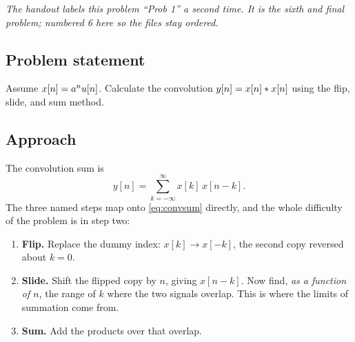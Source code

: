 





\vspace{-6pt}
\begin{center}
{\footnotesize\itshape The handout labels this problem ``Prob 1'' a second time.
It is the sixth and final problem; numbered 6 here so the files stay ordered.}
\end{center}
\vspace{4pt}

\subsection*{Problem statement}

Assume $x[n] = a^n u[n]$. Calculate the convolution
$y[n] = x[n] \ast x[n]$ using the flip, slide, and sum method.

\subsection*{Approach}

The convolution sum is
\begin{equation}
  y[n] = \sum_{k=-\infty}^{\infty} x[k]\,x[n-k].
  \label{eq:convsum}
\end{equation}
The three named steps map onto \eqref{eq:convsum} directly, and the whole
difficulty of the problem is in step two:

\begin{enumerate}
  \item \textbf{Flip.} Replace the dummy index: $x[k] \to x[-k]$, the second copy
    reversed about $k = 0$.
  \item \textbf{Slide.} Shift the flipped copy by $n$, giving $x[n-k]$. Now find,
    \emph{as a function of $n$}, the range of $k$ where the two signals overlap.
    This is where the limits of summation come from.
  \item \textbf{Sum.} Add the products over that overlap.
\end{enumerate}

